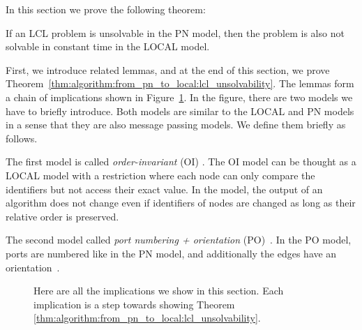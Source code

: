 In this section we prove the following theorem:
\begin{theorem} \label{thm:algorithm:from_pn_to_local:lcl_unsolvability}
    If an LCL problem is unsolvable in the PN model, then the problem is also not solvable in constant time in the LOCAL model.
\end{theorem}

First, we introduce related lemmas, and at the end of this section, we prove Theorem~\ref{thm:algorithm:from_pn_to_local:lcl_unsolvability}.
The lemmas form a chain of implications shown in Figure~\ref{fig:proof_order:lcl_unsolvability}.
In the figure, there are two models we have to briefly introduce.
Both models are similar to the LOCAL and PN models in a sense that they are also message passing models.
We define them briefly as follows.

The first model is called \emph{order-invariant} (OI) \cite{DBLP:journals/siamcomp/NaorS95}.
The OI model can be thought as a LOCAL model with a restriction where each node can only compare the identifiers but not access their exact value.
In the model, the output of an algorithm does not change even if identifiers of nodes are changed as long as their relative order is preserved.

The second model called \emph{port numbering + orientation} (PO)~\cite{DBLP:conf/istcs/MayerNS95}.
In the PO model, ports are numbered like in the PN model, and additionally the edges have an orientation~\cite{DBLP:journals/dc/GoosHS17}.


\begin{figure}[H]
   \centering
    \caption{Here are all the implications we show in this section.
    Each implication is a step towards showing Theorem \ref{thm:algorithm:from_pn_to_local:lcl_unsolvability}.
    }
   \label{fig:proof_order:lcl_unsolvability}
\end{figure}

